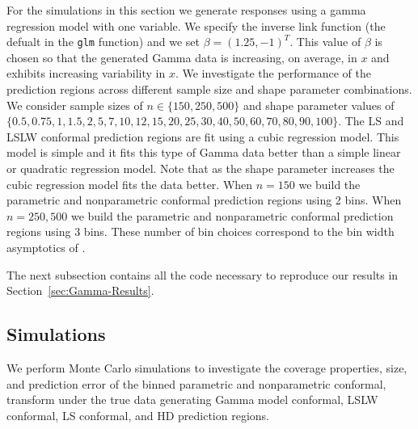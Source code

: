 \documentclass[11pt]{article}\usepackage[]{graphicx}\usepackage[]{color}
\begin{document}
For the simulations in this section we generate responses using a gamma 
regression model with one variable.  We specify the inverse link function 
(the defualt in the \texttt{glm} function) and we set 
$\beta = (1.25, -1)^T$.  This value of $\beta$ is chosen so that the generated 
Gamma data is increasing, on average, in $x$ and exhibits increasing 
variability in $x$.  We investigate the performance of the prediction 
regions across different sample size and shape parameter combinations.  We 
consider sample sizes of $n \in \{150, 250, 500\}$ and shape parameter values 
of $\{0.5, 0.75, 1, 1.5, 2, 5, 7, 10, 12, 15, 20, 25, 30, 40, 50, 60, 70, 80, 90, 100\}$.  
The LS and LSLW conformal prediction regions are fit using a cubic regression 
model.  This model is simple and it fits this type of Gamma data better than a 
simple linear or quadratic regression model.  Note that as the shape parameter 
increases the cubic regression model fits the data better.  When $n = 150$ we 
build the parametric and nonparametric conformal prediction regions using 2 
bins.  When $n = 250, 500$ we build the parametric and nonparametric conformal 
prediction regions using 3 bins.  These number of bin choices correspond to 
the bin width asymptotics of \citet{lei2014distribution}.

The next subsection contains all the code necessary to reproduce our results 
in Section~\ref{sec:Gamma-Results}.



\subsection{Simulations}

We perform Monte Carlo simulations to investigate the coverage properties, 
size, and prediction error of the binned parametric and nonparametric 
conformal, transform under the true data generating Gamma model conformal, 
LSLW conformal, LS conformal, and HD prediction regions.  
\end{document}
